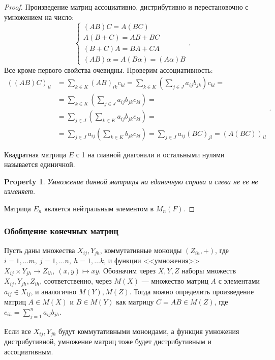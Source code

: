 \documentclass[11pt]{book}
\theoremstyle{definition}
\theoremstyle{plain}
\theoremstyle{plain}
\newtheorem*{prop}{Property}
\theoremstyle{definition}
\theoremstyle{remark}
\begin{document}
\begin{proof}
    Произведение матриц ассоциативно, дистрибутивно и  перестановочно  с умножением на число:
    \[
	\begin{cases}
	    (AB)C = A(BC)\\
	    A(B+C) = AB + BC\\
	    (B+C)A=BA + CA\\
	    (AB)\alpha = A(B\alpha) = (A\alpha)B
	\end{cases}
    .\]
    Все кроме первого свойства очевидны. Проверим ассоциативность:
    \[
	\begin{aligned}
	    \left( (AB) C \right)_{il} &= \sum _{k \in K} (AB)_{ik} c_{kl} = \sum_{k \in K}\left( \sum_{j \in J} a_{ij}b_{jk} \right)  c_{kl}  = \\
				       &= \sum_{k \in K} \left( \sum _{j \in J} a_{ij} b_{jk} c_{kl}\right) = \\
				       &= \sum _{j \in J} \left( \sum _{k \in K} a_{ij} b_{jk} c_{kl} \right) = \\
				       &= \sum _{j \in J} a_{ij} \left( \sum _{k \in K}b_{jk} c_{kl} \right) = \sum _{j \in J} a_{ij} (BC) _{jl} = \left( A(BC) \right)_{il}
	\end{aligned}
    .\]
    \begin{defn}
	Квадратная матрица  $ E$ с 1 на главной диагонали и остальными нулями называется {\sf единичной}.
    \end{defn}
    \begin{prop}
	Умножение данной матрицы на единичную справа и слева не ее не изменяет.
    \end{prop}
    Матрица $ E_n$ является нейтральным элементом в $ M_n(F)$.
\end{proof}
\subsubsection{Обобщение конечных матриц}
Пусть даны множества $ X_{ij}, Y_{jh}$, коммутативные моноиды $ (Z_{ih}, +)$, где $ i = 1, \ldots m, ~ j = 1, \ldots n, ~ h= 1, \ldots k$, и функции <<умножения>> $ X_{ij} \times Y_{jh} \to  Z_{ih}, ~ (x, y) \mapsto xy$.  Обозначим через $ X, Y, Z$ наборы множеств  $ X_{ij}, Y_{jh}, Z_{ih}$, соответственно, через $ M(X)$ --- множество матриц  $ A$ с элементами  $ a_{ij} \in X_{ij}$, и аналогично $ M(Y), M(Z)$. Тогда можно определить произведение матриц $ A \in M(X)$ и $ B \in M(Y)$ как матрицу $ C = AB \in M(Z)$, где $ c_{ih} = \sum\limits_{j = 1}^{n}a_{ij}b_{jh}$.

Если все $ X_{ij}, Y_{jh}$ будут коммутативными моноидами, а функция умножения дистрибутивной, умножение матриц тоже будет дистрибутивным и ассоциативным.
\end{document}
